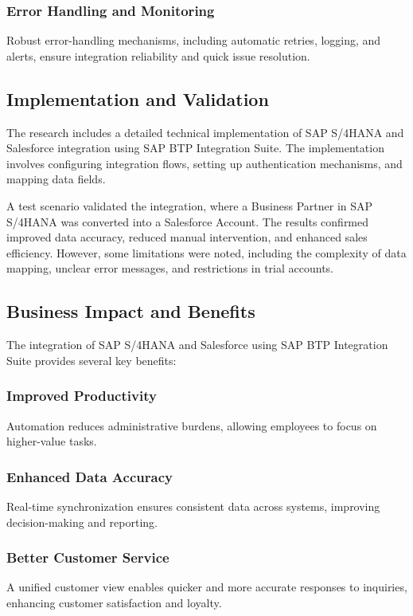 \subsubsection{Error Handling and Monitoring}
Robust error-handling mechanisms, including automatic retries, logging, and alerts, ensure integration reliability and quick issue resolution.

\subsection{Implementation and Validation}
The research includes a detailed technical implementation of SAP S/4HANA and Salesforce integration using SAP BTP Integration Suite. The implementation involves configuring integration flows, setting up authentication mechanisms, and mapping data fields.

A test scenario validated the integration, where a Business Partner in SAP S/4HANA was converted into a Salesforce Account. The results confirmed improved data accuracy, reduced manual intervention, and enhanced sales efficiency. However, some limitations were noted, including the complexity of data mapping, unclear error messages, and restrictions in trial accounts.

\subsection{Business Impact and Benefits}
The integration of SAP S/4HANA and Salesforce using SAP BTP Integration Suite provides several key benefits:

\subsubsection{Improved Productivity}
Automation reduces administrative burdens, allowing employees to focus on higher-value tasks.

\subsubsection{Enhanced Data Accuracy}
Real-time synchronization ensures consistent data across systems, improving decision-making and reporting.

\subsubsection{Better Customer Service}
A unified customer view enables quicker and more accurate responses to inquiries, enhancing customer satisfaction and loyalty.

